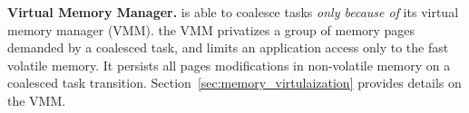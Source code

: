 \textbf{Virtual Memory Manager.} \sys is able to coalesce tasks \emph{only because of} its virtual memory manager (VMM). the VMM privatizes a group of memory pages demanded by a coalesced task, and limits an application access only to the fast volatile memory. It persists all pages modifications in non-volatile memory on a coalesced task transition. Section~\ref{sec:memory_virtulaization} provides details on the VMM.